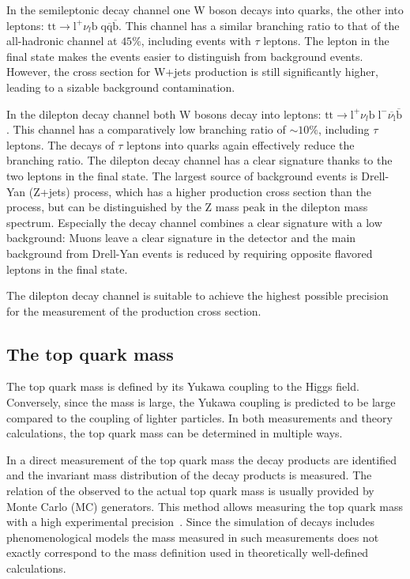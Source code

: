 In the semileptonic decay channel one W boson decays into quarks, the other into leptons: $\mathrm{tt} \rightarrow \mathrm{l}^+ \nu_l \mathrm{b} \; \mathrm{q}\overline{\mathrm{q}}\overline{\mathrm{b}}$. This channel has a similar branching ratio to that of the all-hadronic channel at $45\%$, including events with $\tau$ leptons. 
The lepton in the final state makes the events easier to distinguish from background events. However, the cross section for W+jets production is still significantly higher, leading to a sizable background contamination.

In the dilepton decay channel both W bosons decay into leptons: $\mathrm{tt} \rightarrow \mathrm{l}^+ \nu_l \mathrm{b} \; \mathrm{l}^- \overline{\nu_\mathrm{l}}\overline{\mathrm{b}}$. This channel has a comparatively low branching ratio of $\sim 10\%$, including $\tau$ leptons. The decays of $\tau$ leptons into quarks again effectively reduce the branching ratio.
The dilepton decay channel has a clear signature thanks to the two leptons in the final state. The largest source of background events is Drell-Yan (Z+jets) process, which has a higher production cross section than the \ttbar process, but can be distinguished by the Z mass peak in the dilepton mass spectrum.
Especially the \emu decay channel combines a clear signature with a low background: Muons leave a clear signature in the detector and the main background from Drell-Yan events is reduced by requiring opposite flavored leptons in the final state.

The dilepton decay channel is suitable to achieve the highest possible precision for the measurement of the \ttbar production cross section.

\subsection{The top quark mass}

The top quark mass is defined by its Yukawa coupling to the Higgs field. Conversely, since the mass is large, the Yukawa coupling is predicted to be large compared to the coupling of lighter particles.
In both measurements and theory calculations, the top quark mass can be determined in multiple ways.

In a direct measurement of the top quark mass the decay products are identified and the invariant mass distribution of the decay products is measured. The relation of the observed to the actual top quark mass is usually provided by Monte Carlo (MC) generators.
This method allows measuring the top quark mass with a high experimental precision~\cite{ATLAS:2014wva,Khachatryan:2015hba}. Since the simulation of \ttbar decays includes phenomenological models
the mass measured in such measurements does not exactly correspond to the mass definition used in theoretically well-defined calculations.

